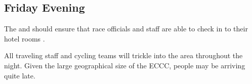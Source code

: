 \subsection{Friday Evening}

The  and  should ensure that race officials and staff are able to check in to their hotel rooms%
%
.

All traveling staff and cycling teams will trickle into the area throughout the night.
Given the large geographical size of the ECCC, people may be arriving quite late.

